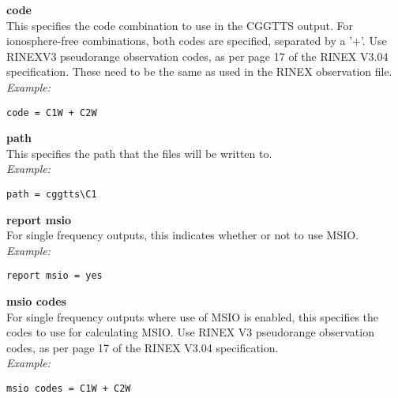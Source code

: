 {\bfseries code}\\
This specifies the code combination to use in the CGGTTS output.
For ionosphere-free combinations, both codes are specified, separated by a '+'.
Use RINEXV3 pseudorange observation codes, as per page 17 of the RINEX V3.04 specification.
These need to be the same as used in the RINEX observation file.\\
\textit{Example:}
\begin{lstlisting}
code = C1W + C2W
\end{lstlisting}


{\bfseries path}\\
This specifies the path that the files will be written to.\\
\textit{Example:}
\begin{lstlisting}
path = cggtts\C1
\end{lstlisting}

{\bfseries report msio}\\
For single frequency outputs, this indicates whether or not to use MSIO.\\
\textit{Example:}
\begin{lstlisting}
report msio = yes
\end{lstlisting}

{\bfseries msio codes}\\
For single frequency outputs where use of MSIO is enabled, this specifies the codes to use for calculating MSIO.
Use RINEX V3 pseudorange observation codes, as per page 17 of the RINEX V3.04 specification.\\
\textit{Example:}
\begin{lstlisting}
msio codes = C1W + C2W
\end{lstlisting}


